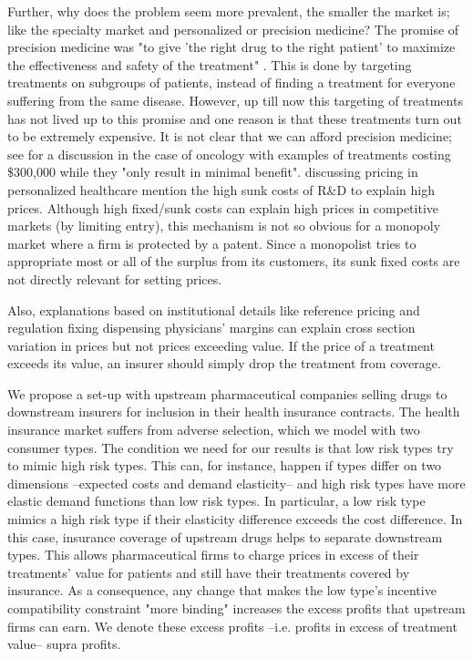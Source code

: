 \documentclass[12pt,english,a4paper]{article}
\begin{document}
Further, why does the problem seem more prevalent, the smaller the market is; like the specialty market and personalized or precision medicine? The promise of precision medicine was "to give 'the right drug to the right patient' to maximize the effectiveness and safety of the treatment" \citep{Garattini2015}. This is done by targeting treatments on subgroups of patients, instead of finding a treatment for everyone suffering from the same disease. However, up till now this targeting of treatments has not lived up to this promise and one reason is that these treatments turn out to be extremely expensive. It is not clear that we can afford precision medicine; see \cite{Doble2016} for a discussion in the case of oncology with examples of treatments costing \$300,000 while they "only result in minimal benefit". \cite{Garrison2017} discussing pricing in personalized healthcare mention the high sunk costs of R\&D to explain high prices. Although high fixed/sunk costs can explain high prices in competitive markets (by limiting entry), this mechanism is not so obvious for a monopoly market where a firm is protected by a patent. Since a monopolist tries to appropriate most or all of the surplus from its customers, its sunk fixed costs are not directly relevant for setting prices.

Also, explanations based on institutional details like reference pricing and regulation fixing dispensing physicians' margins   \citep{Danzon2010} can explain cross section variation in prices but not prices exceeding value. If the price of a treatment exceeds its value, an insurer should simply drop the treatment from coverage.

We propose a set-up with upstream pharmaceutical companies selling drugs to downstream insurers for inclusion in their health insurance contracts. The health insurance market suffers from adverse selection, which we model with two consumer types. The condition we need for our results is that low risk types try to mimic high risk types. This can, for instance, happen if types differ on two dimensions --expected costs and demand elasticity-- and high risk types have more elastic demand functions than low risk types. In particular, a low risk type mimics a high risk type if their elasticity difference exceeds the cost difference. In this case, insurance coverage of upstream drugs helps to separate downstream types. This allows pharmaceutical firms to charge prices in excess of their treatments' value for patients and still have their treatments covered by insurance. As a consequence, any change that makes the low type's incentive compatibility constraint "more binding" increases the excess profits that upstream firms can earn. We denote these excess profits --i.e. profits in excess of treatment value-- supra profits.
\end{document}
